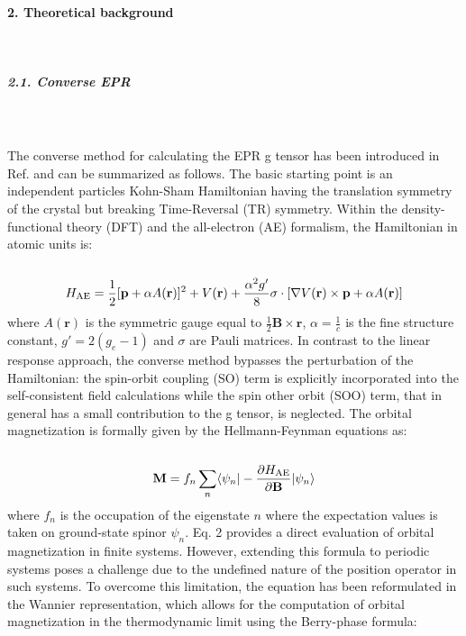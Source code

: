 \documentclass[final,3p,times,twocolumn]{elsarticle}
\newcounter{bla}
\begin{document}
\begin{small}
\paragraph{2. Theoretical background} \
\vskip0.5cm
\noindent
\subparagraph{2.1. Converse EPR}\ \\ \\
The converse method for calculating the EPR g tensor has been introduced in Ref.\cite{PhysRevB.81.060409} and can be summarized as follows. The basic starting point is an independent particles Kohn-Sham Hamiltonian having the translation symmetry of the crystal but breaking Time-Reversal (TR) symmetry. Within the density-functional theory (DFT) and the all-electron (AE) formalism, the Hamiltonian in atomic units is: \\ \\
\begin{equation}
H_{\rm{AE}}=\frac{1}{2}[\mathbf{p}+\alpha A(\mathbf{r})]^{2}+V(\mathbf{r})+\frac{\alpha^{2}g'}{8}\sigma\cdot[\nabla V(\mathbf{r})\times \mathbf{p}+\alpha A(\mathbf{r})]
\end{equation} 
where $A(\mathbf{r})$ is the symmetric gauge equal to $\frac{1}{2} \mathbf{B}\times\mathbf{r}$, $\alpha=\frac{1}{c}$ is the fine structure constant, $g'=2(g_{e}-1)$  and $\sigma$ are Pauli matrices. In contrast to the linear response approach, the converse method bypasses the perturbation of the Hamiltonian: the spin-orbit coupling (SO) term is explicitly incorporated into the self-consistent field calculations while the spin other orbit (SOO) term, that in general has a small contribution to the g tensor, is neglected. The orbital magnetization is formally given by the Hellmann-Feynman equations as: \\ \\
\begin{equation}
\mathbf{M}=f_{n}\sum\limits_{n} \langle \psi_{n}|-\frac{\partial H_{\rm{AE}}}{\partial \mathbf{B}}|\psi_{n}  \rangle
\end{equation}
where $f_{n}$ is the occupation of the eigenstate $n$ where the expectation values is taken on ground-state spinor $\psi_{n}$.
Eq. 2 provides a direct evaluation of orbital magnetization in finite systems. However, extending this formula to periodic systems poses a challenge due to the undefined nature of the position operator in such systems. To overcome this limitation, the equation has been reformulated in the Wannier representation, which allows for the computation of orbital magnetization in the thermodynamic limit using the Berry-phase formula:\\ \\

\end{small}
\end{document}
